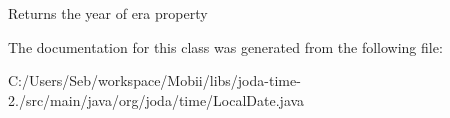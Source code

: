 \begin{DoxyReturn}{Returns}
the year of era property 
\end{DoxyReturn}


The documentation for this class was generated from the following file\-:\begin{DoxyCompactItemize}
\item 
C\-:/\-Users/\-Seb/workspace/\-Mobii/libs/joda-\/time-\/2./src/main/java/org/joda/time/Local\-Date.\-java\end{DoxyCompactItemize}

